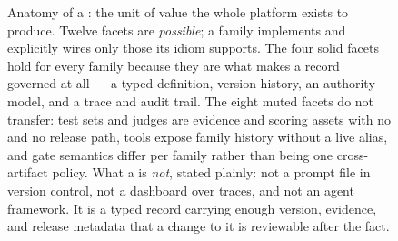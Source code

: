 \begin{figure}[tbp]
\begin{cbscaled}[0.94]
\begin{tikzpicture}[x=1cm,y=1cm]
\end{tikzpicture}
\end{cbscaled}
\caption{Anatomy of a \gasset: the unit of value the whole platform exists to
produce. Twelve facets are \emph{possible}; a family implements and explicitly
wires only those its idiom supports. The four solid facets hold for every family
because they are what makes a record governed at all --- a typed definition,
version history, an authority model, and a trace and audit trail. The eight muted
facets do not transfer: test sets and judges are evidence and scoring assets with
no \livetarget{} and no release path, tools expose family history without a live
alias, and gate semantics differ per family rather than being one cross-artifact
policy. What a \gasset is \emph{not}, stated plainly: not a prompt file in
version control, not a dashboard over traces, and not an agent framework. It is a
typed record carrying enough version, evidence, and release metadata that a change
to it is reviewable after the fact.}
\label{fig:asset}
\end{figure}
